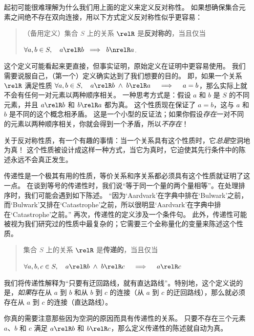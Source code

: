 起初可能很难理解为什么我们用上面的定义来定义反对称性。
如果想确保集合元素之间绝不存在双向连接，用以下方式定义反对称性似乎更容易：

\begin{quote}
（备用定义）集合 $S$ 上的关系 $\relR$ 是{\bf 反对称的}，当且仅当 \newline
\centerline{ $\displaystyle \forall a,b \in S, \quad a \relR b \;
\implies \; b \nrelR a$.}
\end{quote}

这个定义可能看起来更直接，但事实证明，原始定义在证明中更容易使用。
我们需要说服自己，（第一个）定义确实达到了我们想要的目的。
即，如果一个关系 $\relR$ 满足性质 $\displaystyle \forall a,b \in S, \quad a \relR b \; \land \; b \relR a \quad \implies \quad a=b$，那么实际上就不会有任何一对元素以两种顺序相关。
一种思考方式是：假设 $a$ 和 $b$ 是 $S$ 的不同元素，并且 $a \relR b$ 和 $b \relR a$ 都为真。
这个性质现在保证了 $a=b$，这与 $a$ 和 $b$ 是不同的这个概念相矛盾。
这是一个小型的反证法；如果你假设\emph{存在}一对不同的元素以两种顺序相关，你就会得到一个矛盾，所以\emph{不存在}！

关于反对称性质，有一个有趣的事情：当一个关系具有这个性质时，它\emph{总是}空洞地为真！
这个性质被设计成这样一种方式，当它为真时，它迫使其先行条件中的陈述永远不会真正发生。

传递性是一个极其有用的性质，等价关系和序关系都必须具有这个性质就证明了这一点。
在谈到等号的传递性时，我们说“等于同一个量的两个量相等”。在处理排序时，我们可能会遇到如下陈述。
“因为‘Aardvark’在字典中排在‘Bulwark’之前，而‘Bulwark’又排在‘Catastrophe’之前，所以很明显‘Aardvark’在字典中排在‘Catastrophe’之前。”
再次，传递性的定义涉及一个条件句。
此外，传递性可能被视为我们研究过的性质中最复杂的；它需要三个全称量化的变量来陈述这个性质。

\begin{quote}
集合 $S$ 上的关系 $\relR$ 是{\bf 传递的}，当且仅当 \newline
\centerline{ $\displaystyle \forall a,b,c \in S, \quad a \relR b \;
\land \; b \relR c \quad \implies \quad a \relR c$ }
\end{quote}

我们将传递性解释为“只要有迂回路线，就有直达路线”。特别地，这个定义说的是，\emph{如果}存在从 $a$ 到 $b$ 和从 $b$ 到 $c$ 的连接（从 $a$ 到 $c$ 的迂回路线），那么就必须存在从 $a$ 到 $c$ 的连接（直达路线）。

你真的需要注意那些因为空洞的原因而具有传递性的关系。
只要不存在三个元素 $a$、$b$ 和 $c$ 满足 $a \relR b$ 和 $b \relR c$，那么定义传递性的陈述就自动为真。

